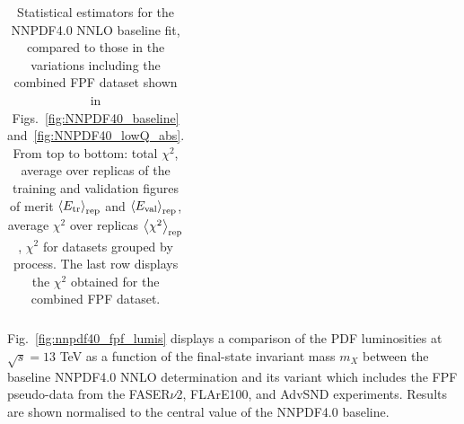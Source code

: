 \begin{table}[!t]
\begin{tabularx}{\textwidth}{X|l|l|l|l}
  \bottomrule
\end{tabularx}
\vspace{0.2cm}
\caption{\small Statistical estimators for the NNPDF4.0 NNLO
  baseline fit, compared to those in the variations including
  the combined FPF dataset shown in Figs.~\ref{fig:NNPDF40_baseline}
  and~\ref{fig:NNPDF40_lowQ_abs}.
  From top to bottom: total $\chi^2$, average
  over replicas of the training and validation figures of merit
  $\left\langle E_{\rm tr}\right\rangle_{\rm rep}$ and $\left\langle E_{\rm val}\right\rangle_{\rm rep}$,
  average $\chi^2$ over replicas $\left\langle \chi^2\right\rangle_{\rm rep}$,
  $\chi^2$ for datasets grouped by process.
  The last row displays the $\chi^2$ obtained for the combined FPF dataset.
  \label{tab:chi2_nnpdf40_baseline}
}
\end{table}



Fig.~\ref{fig:nnpdf40_fpf_lumis} displays a comparison of the PDF luminosities at $\sqrt{s}=13$ TeV
  as a function of the final-state invariant mass $m_X$ between
  the baseline NNPDF4.0 NNLO determination and its variant which includes
  the FPF pseudo-data from the FASER$\nu$2, FLArE100, and AdvSND experiments.
  Results are shown normalised to the central value of the NNPDF4.0 baseline.

